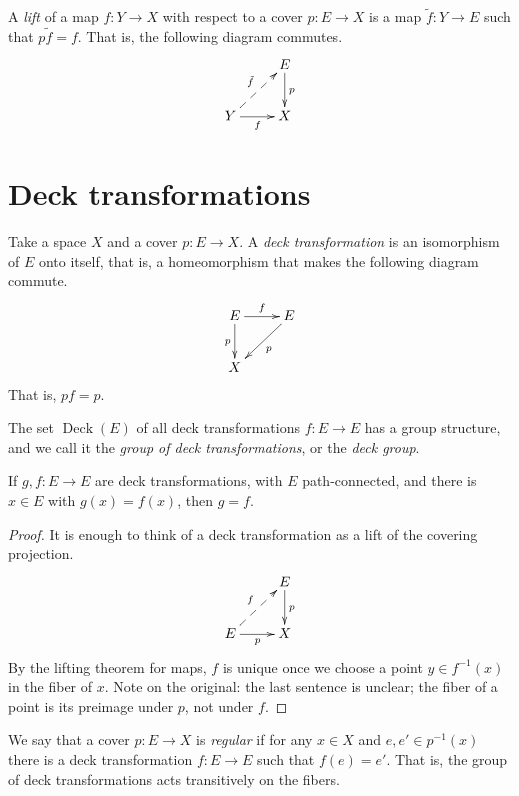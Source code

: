 \begin{definition}
\label{definition-lift}
A {\it lift} of a map $f:Y\to X$ with
respect to a cover $p:E\to X$ is a map
$\tilde{f}:Y\to E$ such that
$p\tilde{f}=f$. That is, the following
diagram commutes.
$$
\xymatrix{
  & E \ar[d]^{p} \\
Y \ar@{-->}[ur]^{\tilde{f}}
  \ar[r]_{f}
  & X
}
$$
\end{definition}

\section{Deck transformations}
\label{section-deck-transformations}

\begin{definition}
\label{definition-deck-transformation}
Take a space $X$ and a cover
$p:E\to X$. A {\it deck transformation}
is an isomorphism of $E$ onto itself,
that is, a homeomorphism that makes the
following diagram commute.
$$
\xymatrix{
E \ar[r]^{f} \ar[d]_{p}
  & E \ar[dl]^{p} \\
X
}
$$
That is, $pf=p$.
\end{definition}

The set $\operatorname{Deck}(E)$ of all
deck transformations $f:E\to E$ has a
group structure, and we call it the
{\it group of deck transformations}, or
the {\it deck group}.

\begin{proposition}
\label{proposition-deck-agree}
If $g,f:E\to E$ are deck
transformations, with $E$
path-connected, and there is $x\in E$
with $g(x)=f(x)$, then $g=f$.
\end{proposition}

\begin{proof}
It is enough to think of a deck
transformation as a lift of the covering
projection.
$$
\xymatrix{
  & E \ar[d]^{p} \\
E \ar@{-->}[ur]^{f}
  \ar[r]_{p}
  & X
}
$$
By the lifting theorem for maps, $f$ is
unique once we choose a point
$y\in f^{-1}(x)$ in the fiber of $x$.
Note on the original: the last sentence
is unclear; the fiber of a point is its
preimage under $p$, not under $f$.
\end{proof}

\begin{definition}
\label{definition-regular-cover}
We say that a cover $p:E\to X$ is
{\it regular} if for any $x\in X$ and
$e,e'\in p^{-1}(x)$ there is a deck
transformation $f:E\to E$ such that
$f(e)=e'$. That is, the group of deck
transformations acts transitively on the
fibers.
\end{definition}

